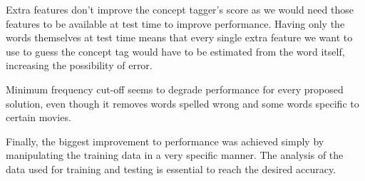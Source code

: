 \documentclass[11pt,a4paper]{article}
\begin{document}
Extra features don't improve the concept tagger's score as we would need those features to be available at test time to improve performance. Having only the words themselves at test time means that every single extra feature we want to use to guess the concept tag would have to be estimated from the word itself, increasing the possibility of error.

Minimum frequency cut-off seems to degrade performance for every proposed solution, even though it removes words spelled wrong and some words specific to certain movies.

Finally, the biggest improvement to performance was achieved simply by manipulating the training data in a very specific manner. The analysis of the data used for training and testing is essential to reach the desired accuracy.




\cite{P16-1001}



%
%



\appendix
\end{document}
